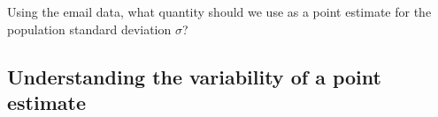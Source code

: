 \begin{exercisewrap}
\begin{nexercise}Using the email data, what quantity should we use as a point estimate for the population standard deviation $\sigma$?\footnotemark
\end{nexercise}
\end{exercisewrap}



%


\D{\newpage}

\subsection{Understanding the variability of a point estimate}
\label{simulationForUnderstandingVariabilitySection}

\newcommand{\pewsolarpollsize}{1000}
\newcommand{\pewsolarparprop}{0.88}
\newcommand{\pewsolarparpropcomplement}{0.12}
\newcommand{\pewsolarparpercent}{88\%}
\newcommand{\pewsolarparpercentcomplement}{12\%}
\newcommand{\pewsolarpollprop}{0.887}
\newcommand{\pewsolarpollpropcomplement}{0.113}
\newcommand{\pewsolarpollpercent}{88.7\%}
\newcommand{\pewsolarpollpercentcomplement}{11.3\%}
\newcommand{\pewsolarpollcount}{887}
\newcommand{\pewsolarpollexpcount}{880}
\newcommand{\pewsolarpollcountcomplement}{113}
\newcommand{\pewsolarpollexpcountcomplement}{120}
\newcommand{\pewsolarpollse}{0.010}

